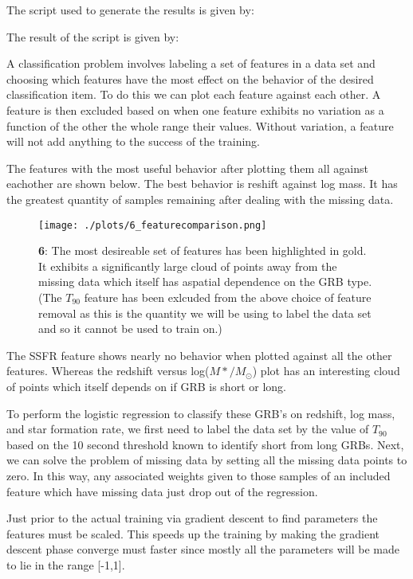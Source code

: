 
The script used to generate the results is given by:



The result of the script is given by:





A classification problem involves labeling a set of features in a data set and choosing which features have the most effect on the behavior of the desired classification item. To do this we can plot each feature against each other. A feature is then excluded based on when one feature exhibits no variation as a function of the other the whole range their values. Without variation, a feature will not add anything to the success of the training.

The features with the most useful behavior after plotting them all against eachother are shown below. The best behavior is reshift against log mass. It has the greatest quantity of samples remaining after dealing with the missing data.
\begin{figure}[h!]
  \centering
  \texttt{[image: ./plots/6\_featurecomparison.png]}
  \caption{\textbf{6}: The most desireable set of features has been highlighted in gold. It exhibits a significantly large cloud of points away from the missing data which itself has aspatial dependence on the GRB type. (The $T_{90}$ feature has been exlcuded from the above choice of feature removal as this  is the quantity we will be using to label the data set and so it cannot be used to train on.)}
  \label{fig:featurecomparison}
\end{figure}

The SSFR feature shows nearly no behavior when plotted against all the other features. Whereas the redshift versus log($M*/M_{\odot}$) plot has an interesting cloud of points which itself depends on if GRB is short or long.

To perform the logistic regression to classify these GRB's on redshift, log mass, and star formation rate, we first need to label the data set by the value of $T_{90}$ based on the 10 second threshold known to identify short from long GRBs. Next, we can solve the problem of missing data by setting all the missing data points to zero. In this way, any associated weights given to those samples of an included feature which have missing data just drop out of the regression.

Just prior to the actual training via gradient descent to find parameters the features must be scaled. This speeds up the training by making the gradient descent phase converge must faster since mostly all the parameters will be made to lie in the range [-1,1].

